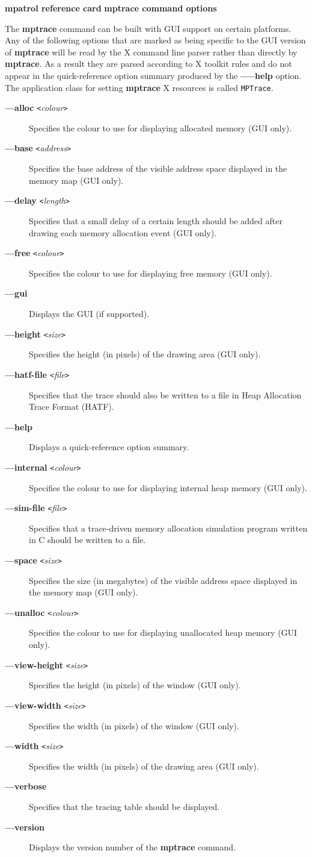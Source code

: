 \documentclass[a4paper,landscape,final]{article}
\newcommand{\heading}[1]{\textbf{\normalsize #1}}
\newcommand{\command}[1]{\textbf{#1}}
\newcommand{\flag}[1]{\textbf{---#1}}
\newcommand{\flagpar}[2]{\flag{#1} \texttt{<}\textit{#2}\texttt{>}}
\begin{document}
\begin{multicols}{3}{\textbf{\Large mpatrol reference card}}
\vskip 12pt
\heading{mptrace command options}
\vskip 6pt

The \command{mptrace} command can be built with GUI support on certain
platforms.  Any of the following options that are marked as being specific to
the GUI version of \command{mptrace} will be read by the X command line parser
rather than directly by \command{mptrace}.  As a result they are parsed
according to X toolkit rules and do not appear in the quick-reference option
summary produced by the \flag{--help} option.  The application class for setting
\command{mptrace} X resources is called \texttt{MPTrace}.

\begin{description}
\item[\flagpar{alloc}{colour}]
Specifies the colour to use for displaying allocated memory (GUI only).
\item[\flagpar{base}{address}]
Specifies the base address of the visible address space displayed in the memory
map (GUI only).
\item[\flagpar{delay}{length}]
Specifies that a small delay of a certain length should be added after drawing
each memory allocation event (GUI only).
\item[\flagpar{free}{colour}]
Specifies the colour to use for displaying free memory (GUI only).
\item[\flag{gui}]
Displays the GUI (if supported).
\item[\flagpar{height}{size}]
Specifies the height (in pixels) of the drawing area (GUI only).
\item[\flagpar{hatf-file}{file}]
Specifies that the trace should also be written to a file in Heap Allocation
Trace Format (HATF).
\item[\flag{help}]
Displays a quick-reference option summary.
\item[\flagpar{internal}{colour}]
Specifies the colour to use for displaying internal heap memory (GUI only).
\item[\flagpar{sim-file}{file}]
Specifies that a trace-driven memory allocation simulation program written in C
should be written to a file.
\item[\flagpar{space}{size}]
Specifies the size (in megabytes) of the visible address space displayed in the
memory map (GUI only).
\item[\flagpar{unalloc}{colour}]
Specifies the colour to use for displaying unallocated heap memory (GUI only).
\item[\flagpar{view-height}{size}]
Specifies the height (in pixels) of the window (GUI only).
\item[\flagpar{view-width}{size}]
Specifies the width (in pixels) of the window (GUI only).
\item[\flagpar{width}{size}]
Specifies the width (in pixels) of the drawing area (GUI only).
\item[\flag{verbose}]
Specifies that the tracing table should be displayed.
\item[\flag{version}]
Displays the version number of the \command{mptrace} command.
\end{description}


\end{multicols}
\end{document}

